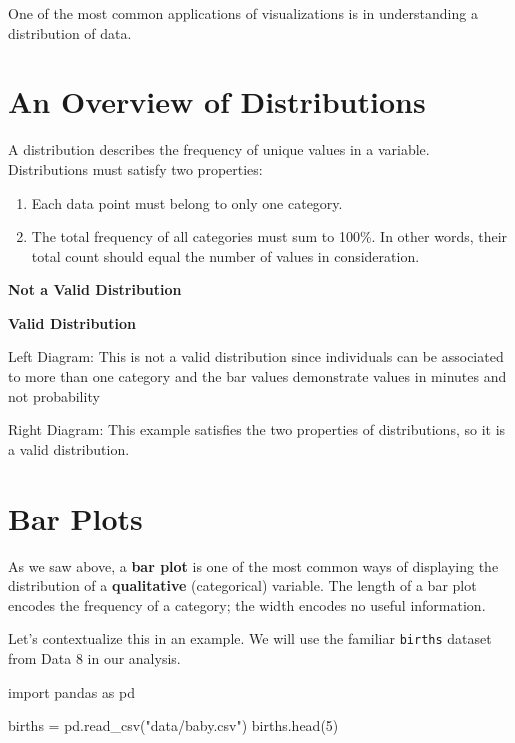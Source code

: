 \documentclass[
  letterpaper,
  DIV=11,
  numbers=noendperiod]{scrreprt}
\newenvironment{Shaded}{\begin{snugshade}}{\end{snugshade}}
\newcommand{\DecValTok}[1]{\textcolor[rgb]{0.68,0.00,0.00}{#1}}
\newcommand{\ImportTok}[1]{\textcolor[rgb]{0.00,0.46,0.62}{#1}}
\newcommand{\NormalTok}[1]{\textcolor[rgb]{0.00,0.23,0.31}{#1}}
\newcommand{\OperatorTok}[1]{\textcolor[rgb]{0.37,0.37,0.37}{#1}}
\newcommand{\StringTok}[1]{\textcolor[rgb]{0.13,0.47,0.30}{#1}}
\providecommand{\tightlist}{%
  \setlength{\itemsep}{0pt}\setlength{\parskip}{0pt}}\usepackage{longtable,booktabs,array}
\begin{document}
One of the most common applications of visualizations is in
understanding a distribution of data.

\hypertarget{an-overview-of-distributions}{%
\section{An Overview of
Distributions}\label{an-overview-of-distributions}}

A distribution describes the frequency of unique values in a variable.
Distributions must satisfy two properties:

\begin{enumerate}
\def\labelenumi{\arabic{enumi}.}
\tightlist
\item
  Each data point must belong to only one category.
\item
  The total frequency of all categories must sum to 100\%. In other
  words, their total count should equal the number of values in
  consideration.
\end{enumerate}

\textbf{Not a Valid Distribution}

\textbf{Valid Distribution}

Left Diagram: This is not a valid distribution since individuals can be
associated to more than one category and the bar values demonstrate
values in minutes and not probability

Right Diagram: This example satisfies the two properties of
distributions, so it is a valid distribution.

\hypertarget{bar-plots}{%
\section{Bar Plots}\label{bar-plots}}

As we saw above, a \textbf{bar plot} is one of the most common ways of
displaying the distribution of a \textbf{qualitative} (categorical)
variable. The length of a bar plot encodes the frequency of a category;
the width encodes no useful information.

Let's contextualize this in an example. We will use the familiar
\texttt{births} dataset from Data 8 in our analysis.

\begin{Shaded}
\begin{Highlighting}[]
\ImportTok{import}\NormalTok{ pandas }\ImportTok{as}\NormalTok{ pd}

\NormalTok{births }\OperatorTok{=}\NormalTok{ pd.read\_csv(}\StringTok{"data/baby.csv"}\NormalTok{)}
\NormalTok{births.head(}\DecValTok{5}\NormalTok{)}
\end{Highlighting}
\end{Shaded}
\end{document}
